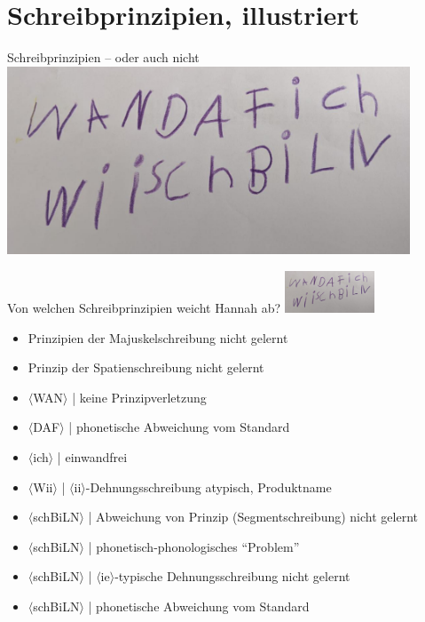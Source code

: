 \section[Prinzipien]{Schreibprinzipien, illustriert}

\begin{frame}
  {Schreibprinzipien -- oder auch nicht}
  \centering 
  \includegraphics[width=0.9\textwidth]{graphics/wii}\\
  \Halbzeile
\end{frame}

\newcommand{\graphem}[1]{\ensuremath{\langle}#1\ensuremath{\rangle}}

\begin{frame}
  {Von welchen Schreibprinzipien weicht Hannah ab?}
  \centering 
  \includegraphics[width=0.2\textwidth]{graphics/wii}\\
  \Halbzeile
  \raggedright
  \begin{itemize}[<+->]
    \item Prinzipien der \alert{Majuskelschreibung} nicht gelernt
    \item Prinzip der \alert{Spatienschreibung} nicht gelernt
    \item \alert{\graphem{WAN}} | \alert{keine} Prinzipverletzung
    \item \alert{\graphem{DAF}} | \alert{phonetische} Abweichung vom Standard
    \item \alert{\graphem{ich}} | einwandfrei
    \item \alert{\graphem{Wii}} | \graphem{ii}-Dehnungsschreibung atypisch, \alert{Produktname}
    \item \graphem{\alert{sch}BiLN} | \alert{Abweichung von Prinzip} (Segmentschreibung) nicht gelernt
    \item \graphem{sch\alert{B}iLN} | \alert{phonetisch-phonologisches} "`Problem"'
    \item \graphem{schB\alert{i}LN} | \graphem{ie}-typische Dehnungsschreibung nicht gelernt
    \item \graphem{schBiL\alert{N}} | \alert{phonetische} Abweichung vom Standard
  \end{itemize}
\end{frame}

